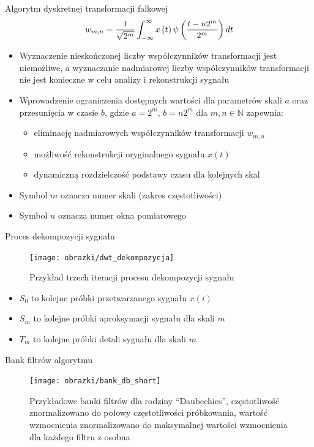 \documentclass[12pt, polish, aspectratio = 169]{beamer}
\begin{document}
\begin{frame}{Algorytm dyskretnej transformacji falkowej}
\begin{equation}
w_{m,n} = \frac{1}{\sqrt{2^{m}}} \int _{-\infty} ^{\infty} x \left(t\right) \psi \left(\frac{t - n 2^{m}}{2^{m}}\right) dt \label{eq:dwt}
\end{equation}
\begin{itemize}
\item Wyznaczenie nieskończonej liczby współczynników transformacji jest niemożliwe, a wyznaczanie nadmiarowej liczby współczynników transformacji nie jest konieczne w celu analizy i rekonstrukcji sygnału
\item Wprowadzenie ograniczenia dostępnych wartości dla parametrów skali $a$ oraz przesunięcia w czasie $b$, gdzie $a = 2^m$, $b = n2^m$ dla $m, n \in \mathbb{N}$ zapewnia:
	\begin{itemize}
	\item eliminację nadmiarowych współczynników transformacji $w_{m,n}$
	\item możliwość rekonstrukcji oryginalnego sygnału $x(t)$
	\item dynamiczną rozdzielczość podstawy czasu dla kolejnych skal
	\end{itemize}
\item Symbol $m$ oznacza numer skali (zakres częstotliwości)
\item Symbol $n$ oznacza numer okna pomiarowego
\end{itemize}
\end{frame}

\begin{frame}{Proces dekompozycji sygnału}
\begin{figure}
\texttt{[image: obrazki/dwt\_dekompozycja]}
\caption{Przykład trzech iteracji procesu dekompozycji sygnału}
\label{fig:fwt_decomp}
\end{figure}
\begin{itemize}
\item $S_{0}$ to kolejne próbki przetwarzanego sygnału $x(i)$
\item $S_{m}$ to kolejne próbki aproksymacji sygnału dla skali $m$
\item $T_{m}$ to kolejne próbki detali sygnału dla skali $m$
\end{itemize}
\end{frame}

\begin{frame}{Bank filtrów algorytmu}
\begin{figure}
\texttt{[image: obrazki/bank\_db\_short]}
\caption{Przykładowe banki filtrów dla rodziny \enquote{Daubechies}, częstotliwość znormalizowano do połowy częstotliwości próbkowania, wartość wzmocnienia znormalizowano do maksymalnej wartości wzmocnienia dla każdego filtru z osobna}
\end{figure}
\end{frame}
\end{document}
